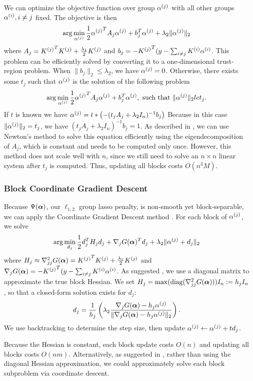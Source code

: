 We can optimize the objective function over group ${\alpha^{(j)}}$ with all other groups
${\alpha^{(i)}}, i \ne j$ fixed. The objective is then
\[
\arg\min_{\alpha^{(j)}} \frac{1}{2}{\alpha^{(j)}}^T A_j {\alpha^{(j)}} + b_j^T {\alpha^{(j)}} + \lambda_2 \|{\alpha^{(j)}}\|_2
\]
where $A_j = {K^{(j)}}^T {K^{(j)}} + \frac{\lambda_1}{2}{K^{(j)}}$ 
and $b_j = -{K^{(j)}}^T (y-\sum_{i\ne j}{{K^{(i)}} {\alpha^{(i)}}}$.
This problem can be efficiently solved \citep{bcd-group-lasso:2013} 
by converting it to a one-dimensional trust-region problem. 
When $\|b_j\|_2 \le \lambda_2$, we have ${\alpha^{(j)}} = 0$. 
Otherwise, there exists some $t_j$ such that ${\alpha^{(j)}}$ is the solution of the following
problem
\[
\arg\min_{\alpha^{(j)}} \frac{1}{2}{\alpha^{(j)}}^T A_j {\alpha^{(j)}} + b_j^T {\alpha^{(j)}}, 
\text{ such that } \|{\alpha^{(j)}}\|_2 le t_j.
\]
If $t$ is known we have ${\alpha^{(j)}} = t * \left(-(t_j A_j + \lambda_2 I_n)^{-1} b_j\right)$
Because in this case $\|{\alpha^{(j)}}\|_2 = t_j$, we have $(t_j A_j + \lambda_2 I_n)^{-1} b_j = 1$.
As described in \citet{bcd-group-lasso:2013}, 
we can use Newton's method to solve this equation efficiently 
using the eigendecomposition of $A_j$, which is constant and needs to be computed only once.
However, this method does not scale well with $n$, since we still need
to solve an $n \times n$ linear system after $t_j$ is computed.
Thus, updating all blocks costs $O(n^3 M)$.

\subsubsection*{Block Coordinate Gradient Descent}

Because $\Psi({\bm{\alpha}})$, our $\ell_{1,2}$ group lasso penalty, is non-smooth yet block-separable,
we can apply the Coordinate Gradient Descent method \citep{cgd:2009}.
For each block of ${\alpha^{(j)}}$, we solve
\[
\arg\min_{d_j} \frac{1}{2}d_j^T H_j d_j + \nabla_{j}G({\bm{\alpha}})^T d_j 
+ \lambda_2 \|{\alpha^{(j)}}+d_j\|_2
\]
where $H_j \approx \nabla^2_{jj}G({\bm{\alpha}}) = {K^{(j)}}^T {K^{(j)}} + \frac{\lambda_1}{2}{K^{(j)}}$ 
and $\nabla_j G({\bm{\alpha}}) = -{K^{(j)}}^T (y-\sum_{i\ne j}{{K^{(i)}} {\alpha^{(i)}}}$.
As suggested \citet{cgd:2009}, we use a diagonal matrix to approximate the true block Hessian.
We set $H_j = \max({\rm diag}(\nabla^2_{jj}G({\bm{\alpha}}))) I_n := h_j I_n$, so that a closed-form solution exists
for $d_j$:
\[
d_j = \frac{1}{h_j}\left(\lambda_2 \frac{\nabla_j G({\bm{\alpha}}) - h_j {\alpha^{(j)}}}
{\|\nabla_j G({\bm{\alpha}}) - h_j {\alpha^{(j)}}\|_2}\right).
\]
We use backtracking to determine the step size, then update ${\alpha^{(j)}} \leftarrow {\alpha^{(j)}} + t d_j$.

Because the Hessian is constant, each block update costs $O(n)$ and updating all blocks costs $O(nm)$.
Alternatively, as suggested in \citet{note-group-lasso:2010}, rather than using the 
diagonal Hessian approximation, we could approximately solve each block subproblem via 
coordinate descent.
